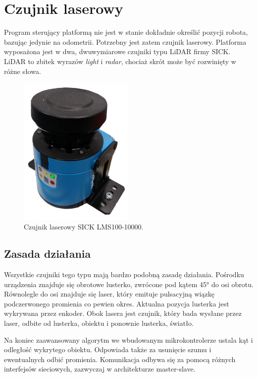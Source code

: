 \section{Czujnik laserowy}
	\label{sec:lidar}
	Program sterujący platformą nie jest w stanie dokładnie określić pozycji robota, bazując jedynie na odometrii.
	Potrzebny jest zatem czujnik laserowy.
	Platforma wyposażona jest w dwa, dwuwymiarowe czujniki typu LiDAR firmy SICK.
	LiDAR to zbitek wyrazów \emph{light} i \emph{radar}, chociaż skrót może być rozwinięty w różne słowa.

	\begin{figure}[H]
	\centering
	\includegraphics[width=0.5\textwidth]{graphics/sensor.png}
	\caption{Czujnik laserowy SICK LMS100-10000.}
	\label{fig:sensor}
	\end{figure} 

	\subsection{Zasada działania}
	Wszystkie czujniki tego typu mają bardzo podobną zasadę działania.
	Pośrodku urządzenia znajduje się obrotowe lusterko, zwrócone pod kątem 45° do osi obrotu.
	Równolegle do osi znajduje się laser, który emituje pulsacyjną wiązkę podczerwonego promienia co pewien okres.
	Aktualna pozycja lusterka jest wykrywana przez enkoder.
	Obok lasera jest czujnik, który bada wysłane przez laser, odbite od lusterka, obiektu i ponownie lusterka, światło.

	Na koniec zaawansowany algorytm we wbudowanym mikrokontrolerze ustala kąt i odległość wykrytego obiektu.
	Odpowiada także za usunięcie szumu i ewentualnych odbić promienia.
	Komunikacja odbywa się za pomocą różnych interfejsów sieciowych, zazwyczaj w architekturze master-slave.

